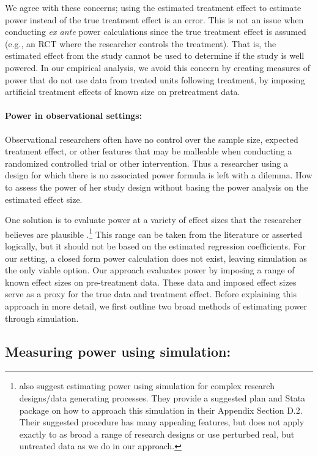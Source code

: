 \documentclass[12pt]{article}%
\begin{document}
We agree with these concerns;  
using the estimated treatment effect to estimate power instead of the true treatment effect is an error.  
This is not an issue when conducting \emph{ex ante} power calculations since the true treatment effect is  assumed (e.g., an RCT where the researcher controls the treatment). 
That is, the estimated effect from the study cannot be used to determine if the study is well powered. 
In our empirical analysis, we avoid this concern by creating measures of power that do not use data from treated units following treatment,  by imposing artificial treatment effects of known size on pretreatment data. 


\paragraph{Power in observational settings:}
Observational researchers often have no control over the sample size, expected treatment effect, or other features that may be malleable when conducting a randomized controlled trial or other intervention. 
Thus a researcher using a design for which there is no associated power formula is left with a dilemma. 
How to assess the power of her study design without basing the power analysis on the estimated effect size. 

One solution is to evaluate power at a variety of effect sizes that the researcher believes are plausible \citep{Arnold2011,Gelman2014}.\footnote{\citet{Burlig2019} also suggest estimating power using simulation for complex research designs/data generating processes. They provide a suggested plan and Stata package on how to approach this simulation in their Appendix Section D.2.
Their suggested procedure has many appealing features, but does not apply exactly to as broad a range of research designs or use perturbed real, but untreated data as we do in our approach.}
This range can be taken from the literature or asserted logically, but it should not be based on the estimated regression coefficients. 
For our setting, a closed form power calculation does not exist, leaving simulation as the only viable option. 
Our approach evaluates power by imposing a range of known effect sizes on pre-treatment data. 
These data and imposed effect sizes serve as a proxy for the true data and treatment effect. 
Before explaining this approach in more detail, we first outline two broad methods of estimating power through simulation. 

\subsection{Measuring power using simulation: }
\end{document}
